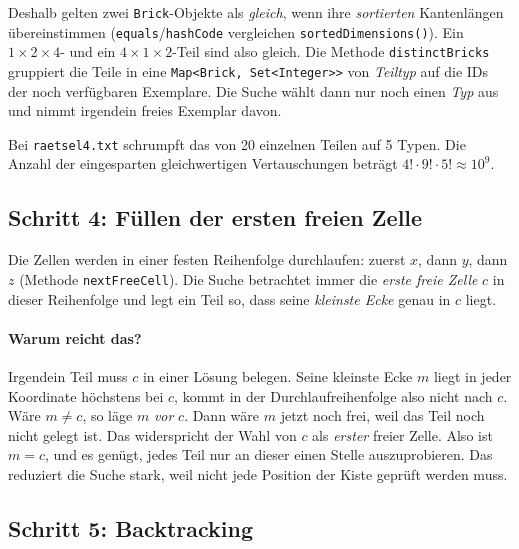 \documentclass[11pt,a4paper,parskip=half]{scrartcl}
\newcommand{\code}[1]{\texttt{#1}}
\newcommand{\file}[1]{\texttt{#1}}
\begin{document}
Deshalb gelten zwei \code{Brick}-Objekte als \emph{gleich}, wenn ihre
\emph{sortierten} Kantenlängen übereinstimmen (\code{equals}/\code{hashCode}
vergleichen \code{sortedDimensions()}). Ein $1\times2\times4$- und ein
$4\times1\times2$-Teil sind also gleich. Die Methode \code{distinctBricks} gruppiert
die Teile in eine \code{Map<Brick, Set<Integer>>} von \emph{Teiltyp} auf die IDs der
noch verfügbaren Exemplare. Die Suche wählt dann nur noch einen \emph{Typ} aus und
nimmt irgendein freies Exemplar davon.

Bei \file{raetsel4.txt} schrumpft das von 20 einzelnen Teilen auf 5 Typen. Die
Anzahl der eingesparten gleichwertigen Vertauschungen beträgt
$4!\cdot 9!\cdot 5! \approx 10^9$.

\subsection{Schritt 4: Füllen der ersten freien Zelle}

Die Zellen werden in einer festen Reihenfolge durchlaufen: zuerst $x$, dann $y$, dann
$z$ (Methode \code{nextFreeCell}). Die Suche betrachtet immer die \emph{erste freie
Zelle} $c$ in dieser Reihenfolge und legt ein Teil so, dass seine \emph{kleinste
Ecke} genau in $c$ liegt.

\paragraph{Warum reicht das?}
Irgendein Teil muss $c$ in einer Lösung belegen. Seine kleinste Ecke $m$ liegt in
jeder Koordinate höchstens bei $c$, kommt in der Durchlaufreihenfolge also nicht nach
$c$. Wäre $m \neq c$, so läge $m$ \emph{vor} $c$. Dann wäre $m$ jetzt noch frei, weil
das Teil noch nicht gelegt ist. Das widerspricht der Wahl von $c$ als
\emph{erster} freier Zelle. Also ist $m = c$, und es genügt, jedes Teil nur an dieser
einen Stelle auszuprobieren. Das reduziert die Suche stark, weil nicht jede Position
der Kiste geprüft werden muss.

\subsection{Schritt 5: Backtracking}
\end{document}
